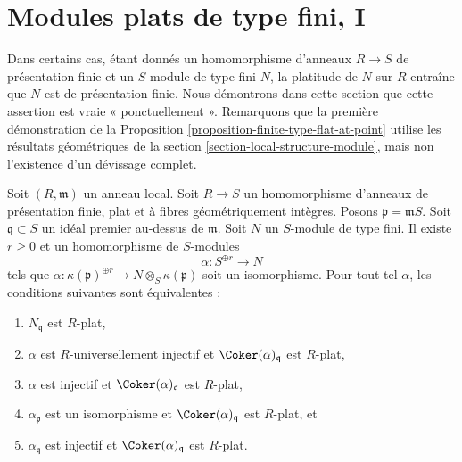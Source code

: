 












\section{Modules plats de type fini, I}
\label{section-finite-type-flat-I}

\noindent
Dans certains cas, étant donnés un homomorphisme d'anneaux $R \to S$ de présentation finie et
un $S$-module de type fini $N$, la platitude de $N$ sur $R$ entraîne que $N$
est de présentation finie. Nous démontrons dans cette section que cette assertion est vraie
« ponctuellement ». Remarquons que la première démonstration de la
Proposition \ref{proposition-finite-type-flat-at-point}
utilise les résultats géométriques de la
section \ref{section-local-structure-module},
mais non l'existence d'un d\'evissage complet.

\begin{lemma}
\label{lemma-induction-step}
Soit $(R, \mathfrak m)$ un anneau local. Soit $R \to S$ un homomorphisme d'anneaux de présentation finie,
plat et à fibres géométriquement intègres. Posons
$\mathfrak p = \mathfrak mS$. Soit $\mathfrak q \subset S$ un idéal premier
au-dessus de $\mathfrak m$. Soit $N$ un $S$-module de type fini.
Il existe $r \geq 0$ et un homomorphisme de $S$-modules
$$
\alpha : S^{\oplus r} \longrightarrow N
$$
tels que
$\alpha : \kappa(\mathfrak p)^{\oplus r} \to N \otimes_S \kappa(\mathfrak p)$
soit un isomorphisme. Pour tout tel $\alpha$, les conditions suivantes sont équivalentes :
\begin{enumerate}
\item $N_{\mathfrak q}$ est $R$-plat,
\item $\alpha$ est $R$-universellement injectif et
$\Coker(\alpha)_{\mathfrak q}$ est $R$-plat,
\item $\alpha$ est injectif et
$\Coker(\alpha)_{\mathfrak q}$ est $R$-plat,
\item $\alpha_{\mathfrak p}$ est un isomorphisme et
$\Coker(\alpha)_{\mathfrak q}$ est $R$-plat, et
\item $\alpha_{\mathfrak q}$ est injectif et
$\Coker(\alpha)_{\mathfrak q}$ est $R$-plat.
\end{enumerate}
\end{lemma}

